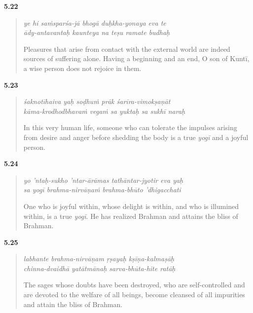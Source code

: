 \par\noindent\textbf{5.22}\par
\begin{verse}
\textit{ye hi saṁsparśa-jā bhogā duḥkha-yonaya eva te} \\
\textit{ādy-antavantaḥ kaunteya na teṣu ramate budhaḥ}

\noindent Pleasures that arise from contact with the external world are indeed sources of suffering alone. Having a beginning and an end, O son of Kuntī, a wise person does not rejoice in them.
\end{verse}
\par



\par\noindent\textbf{5.23}\par
\begin{verse}
\textit{śaknotīhaiva yaḥ soḍhuṁ prāk śarīra-vimokṣaṇāt} \\
\textit{kāma-krodhodbhavaṁ vegaṁ sa yuktaḥ sa sukhī naraḥ}

\noindent In this very human life, someone who can tolerate the impulses arising from desire and anger before shedding the body is a true \textit{yogī} and a joyful person.
\end{verse}
\par



\par\noindent\textbf{5.24}\par
\begin{verse}
\textit{yo ’ntaḥ-sukho ’ntar-ārāmas tathāntar-jyotir eva yaḥ} \\
\textit{sa yogī brahma-nirvāṇaṁ brahma-bhūto ’dhigacchati}

\noindent One who is joyful within, whose delight is within, and who is illumined within, is a true \textit{yogī}. He has realized Brahman and attains the bliss of Brahman.
\end{verse}
\par



\par\noindent\textbf{5.25}\par
\begin{verse}
\textit{labhante brahma-nirvāṇam ṛṣayaḥ kṣīṇa-kalmaṣāḥ} \\
\textit{chinna-dvaidhā yatātmānaḥ sarva-bhūta-hite ratāḥ}

\noindent The sages whose doubts have been destroyed, who are self-controlled and are devoted to the welfare of all beings, become cleansed of all impurities and attain the bliss of Brahman.
\end{verse}
\par




